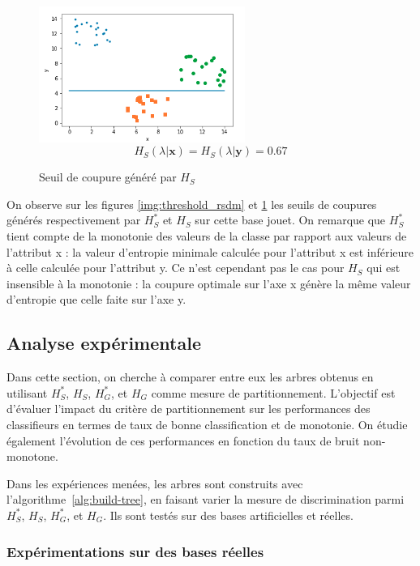 \documentclass[a4paper]{article}
\newcommand{\algoref}[1]{algorithme~\ref{#1}}
\begin{document}
\begin{figure}[H]
	\center 
	\includegraphics[width=0.6\textwidth]{images/threshold_sdm.png}
    $$H_S(\lambda | \mathbf{x}) = H_S(\lambda | \mathbf{y}) =  0.67$$
    \caption{Seuil de coupure généré par $H_S$}
    \label{img:threshold_sdm}
\end{figure}

On observe sur les figures \ref{img:threshold_rsdm} et \ref{img:threshold_sdm}
les seuils de coupures générés respectivement par $H^*_S$ et $H_S$ sur cette
base jouet. On remarque que $H^*_S$ tient compte de la monotonie des valeurs de
la classe par rapport aux valeurs de l'attribut x : la valeur d'entropie
minimale calculée pour l'attribut x est inférieure à celle calculée pour
l'attribut y. Ce n'est cependant pas le cas pour $H_S$ qui est insensible à la
monotonie : la coupure optimale sur l'axe x génère la même valeur d'entropie que
celle faite sur l'axe y.

\subsection{Analyse expérimentale} 

Dans cette section, on cherche à comparer entre eux les arbres obtenus en
utilisant $H^*_S$, $H_S$, $H^*_G$, et $H_G$ comme mesure de partitionnement.
L'objectif est d'évaluer l'impact du critère de partitionnement sur les
performances des classifieurs en termes de taux de bonne classification et de
monotonie. On étudie également l'évolution de ces performances en fonction du
taux de bruit non-monotone. 

Dans les expériences menées, les arbres sont construits avec
l'\algoref{alg:build-tree}, en faisant varier la mesure de discrimination parmi
$H^*_S$, $H_S$, $H^*_G$, et $H_G$. Ils sont testés sur des bases artificielles
et réelles.

\subsubsection{Expérimentations sur des bases réelles}
\end{document}
